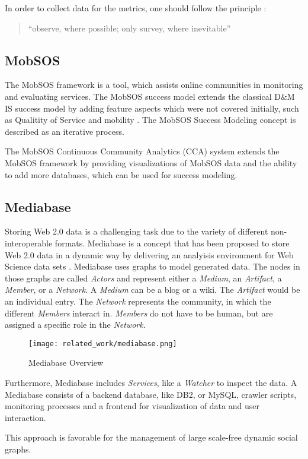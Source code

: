 In order to collect data for the metrics, one should follow the principle \cite{RKJa15}:
\begin{quotation}
	``observe, where possible; only survey,	where inevitable''
\end{quotation}

\subsection{MobSOS}
The MobSOS framework is a tool, which assists online communities in monitoring and evaluating services. The MobSOS success model extends the classical D\&M IS success model by adding feature aspects which were not covered initially, such as Qualitity of Service and mobility \cite{Renz08}.
The MobSOS Success Modeling concept is described as an iterative process.

The MobSOS Continuous Community Analytics (CCA) system extends the MobSOS framework by providing visualizations of MobSOS data and the ability to add more databases, which can be used for success modeling.

\subsection{Mediabase}
Storing Web 2.0 data is a challenging task due to the variety of different non-interoperable formats.
Mediabase is a concept that has been proposed to store Web 2.0 data in a dynamic way by delivering an analyisis environment for Web Science data sets \cite{KlPe08}.
Mediabase uses graphs to model generated data.
The nodes in those graphs are called \emph{Actors} and represent either a \emph{ Medium}, an \emph{Artifact}, a \emph{Member}, or a \emph{Network}.
A \emph{ Medium} can be a blog or a wiki.
The \emph{Artifact} would be an individual entry.
The \emph{Network} represents the community, in which the different \emph{Members} interact in.
\emph{Members} do not have to be human, but are assigned a specific role in the \emph{Network}.
\begin{figure}[h]
	\centering
	\texttt{[image: related\_work/mediabase.png]}
	\caption{Mediabase Overview \cite{Klam10e}}
\end{figure}
Furthermore, Mediabase includes \emph{Services}, like a \emph{Watcher} to inspect the data.
A Mediabase consists of a backend database, like DB2, or MySQL, crawler scripts, monitoring processes and a frontend for visualization of data and user interaction.

This approach is favorable for the management of large scale-free dynamic social graphs.

